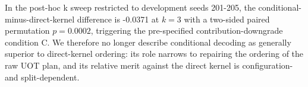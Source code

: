 In the post-hoc k sweep restricted to development seeds 201-205, the conditional-minus-direct-kernel difference is -0.0371 at $k=3$ with a two-sided paired permutation $p = 0.0002$, triggering the pre-specified contribution-downgrade condition C. We therefore no longer describe conditional decoding as generally superior to direct-kernel ordering: its role narrows to repairing the ordering of the raw UOT plan, and its relative merit against the direct kernel is configuration- and split-dependent.

